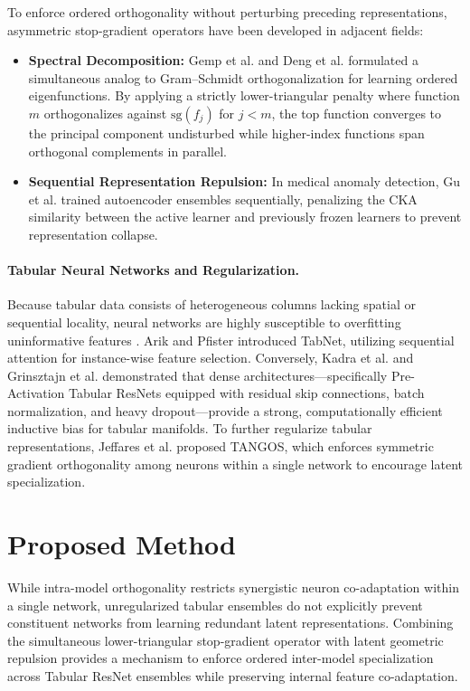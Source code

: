 \documentclass[11pt, a4paper]{article}
\begin{document}
To enforce ordered orthogonality without perturbing preceding representations, asymmetric stop-gradient operators have been developed in adjacent fields:
\begin{itemize}
    \item \textbf{Spectral Decomposition:} Gemp et al. \cite{gemp2021eigengame} and Deng et al. \cite{deng2022neuralef} formulated a simultaneous analog to Gram--Schmidt orthogonalization for learning ordered eigenfunctions. By applying a strictly lower-triangular penalty where function $m$ orthogonalizes against $\text{sg}(f_j)$ for $j < m$, the top function converges to the principal component undisturbed while higher-index functions span orthogonal complements in parallel.
    \item \textbf{Sequential Representation Repulsion:} In medical anomaly detection, Gu et al. \cite{gu2024revisiting} trained autoencoder ensembles sequentially, penalizing the CKA similarity between the active learner and previously frozen learners to prevent representation collapse.
\end{itemize}

\paragraph{Tabular Neural Networks and Regularization.}
Because tabular data consists of heterogeneous columns lacking spatial or sequential locality, neural networks are highly susceptible to overfitting uninformative features \cite{grinsztajn2022why}. Arik and Pfister \cite{arik2021tabnet} introduced TabNet, utilizing sequential attention for instance-wise feature selection. Conversely, Kadra et al. \cite{kadra2021well} and Grinsztajn et al. \cite{grinsztajn2022why} demonstrated that dense architectures—specifically Pre-Activation Tabular ResNets equipped with residual skip connections, batch normalization, and heavy dropout—provide a strong, computationally efficient inductive bias for tabular manifolds. To further regularize tabular representations, Jeffares et al. \cite{jeffares2023tangos} proposed TANGOS, which enforces symmetric gradient orthogonality among neurons within a single network to encourage latent specialization.


\section{Proposed Method}
While intra-model orthogonality \cite{jeffares2023tangos} restricts synergistic neuron co-adaptation within a single network, unregularized tabular ensembles \cite{fort2019deep, wen2020batchensemble, grinsztajn2022why} do not explicitly prevent constituent networks from learning redundant latent representations. Combining the simultaneous lower-triangular stop-gradient operator \cite{gemp2021eigengame, deng2022neuralef} with latent geometric repulsion \cite{kornblith2019similarity, gu2024revisiting} provides a mechanism to enforce ordered inter-model specialization across Tabular ResNet ensembles while preserving internal feature co-adaptation.
\end{document}
